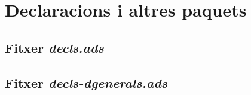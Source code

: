 \section{Declaracions i altres paquets}

\subsection{Fitxer \emph{decls.ads}}

\newpage

\subsection{Fitxer \emph{decls-dgenerals.ads}}

\newpage

%

%
